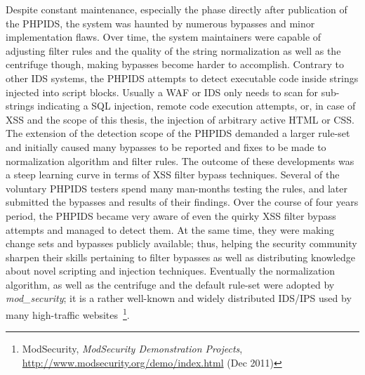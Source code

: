       Despite constant maintenance, especially the phase directly after publication of the \mbox{PHPIDS}, the system was haunted by numerous bypasses and minor implementation flaws. Over time, the system maintainers were capable of adjusting filter rules and the quality of the string normalization as well as the centrifuge though, making bypasses become harder to accomplish. Contrary to other IDS systems, the PHPIDS attempts to detect executable code inside strings injected into script blocks. Usually a WAF or IDS only needs to scan for sub-strings indicating a SQL injection, remote code execution attempts, or, in case of XSS and the scope of this thesis, the injection of arbitrary active HTML or CSS. The extension of the detection scope of the PHPIDS demanded a larger rule-set and initially caused many bypasses to be reported and fixes to be made to normalization algorithm and filter rules. The outcome of these developments was a steep learning curve in terms of XSS filter bypass techniques. Several of the 
voluntary PHPIDS testers spend many man-months testing the rules, and later submitted the bypasses and results of their findings. Over the course of four years period, the PHPIDS became very aware of even the quirky XSS filter bypass attempts and managed to detect them. At the same time, they were making change sets and bypasses publicly available; thus, helping the security community sharpen their skills pertaining to filter bypasses as well as distributing knowledge about novel scripting and injection techniques. Eventually the normalization algorithm, as well as the centrifuge and the default rule-set were adopted by \textit{mod\_security}; it is a rather well-known and widely distributed IDS/IPS used by many high-traffic websites~\footnote{ModSecurity, \textit{ModSecurity Demonstration Projects}, \url{http://www.modsecurity.org/demo/index.html} (Dec 2011)}.\\

